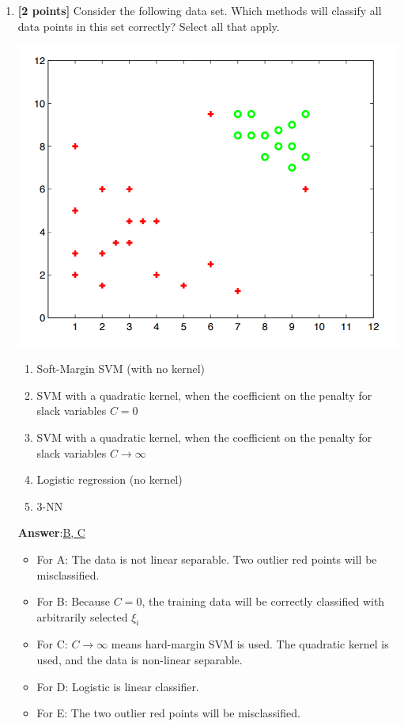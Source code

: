 \begin{enumerate}
	\item {\textbf{[2 points]} Consider the following data set. Which methods will classify all data points in this set correctly? Select all that apply. \\
		\begin{minipage}[!ht]{0.5\textwidth}
			\centering
			\includegraphics[width=1.0\textwidth]{mcq_data.png}
			\label{fig:svm_quad_a}
		\end{minipage}
		\begin{minipage}[!ht]{0.5\textwidth}
			\begin{enumerate}[label=\Alph*)]
				\item Soft-Margin SVM (with no kernel)
				\item SVM with a quadratic kernel, when the coefficient on the penalty for slack variables $C = 0$
				\item SVM with a quadratic kernel, when the coefficient on the penalty for slack variables $C \rightarrow \infty$
				\item Logistic regression (no kernel)
				\item 3-NN
			\end{enumerate}
		\end{minipage} 
	}
	\textbf{Answer}:\underline{B, C}\\
	\begin{itemize}
		\item For A: The data is not linear separable. Two outlier red points will be misclassified.
		\item For B: Because $C=0$, the training data will be correctly classified with arbitrarily selected $\xi_i$
		\item For C: $C\rightarrow \infty$ means hard-margin SVM is used. The quadratic kernel is used, and the data is non-linear separable.
		\item For D: Logistic is linear classifier.
		\item For E: The two outlier red points will be misclassified.
	\end{itemize}
	
\end{enumerate}

\newpage

